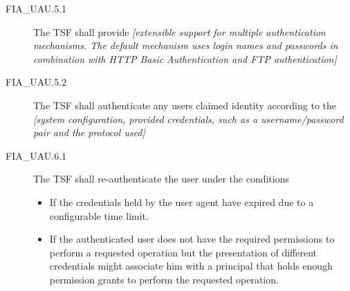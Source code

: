 \documentclass[12pt,english]{scrbook}
\begin{document}
\begin{description}
\item[FIA{\_}UAU.5.1 ]

The TSF shall provide \emph{{[}extensible support for multiple
authentication mechanisms. The default mechanism uses login names
and passwords in combination with HTTP Basic Authentication and FTP
authentication]}

\item[FIA{\_}UAU.5.2]

The TSF shall authenticate any users claimed identity according to
the \emph{{[}system configuration, provided credentials, such as a
username/password pair and the protocol used]}

\end{description}





\begin{description}
\item[FIA{\_}UAU.6.1 ]

The TSF shall re-authenticate the user under the conditions
\begin{itemize}
\item {} 
If the credentials held by the user agent have expired due to
a configurable time limit.

\item {} 
If the authenticated user does not have the required permissions to
perform a requested operation but the presentation of different
credentials might associate him with a principal that holds enough
permission grants to perform the requested operation.

\end{itemize}

\end{description}
\end{document}
